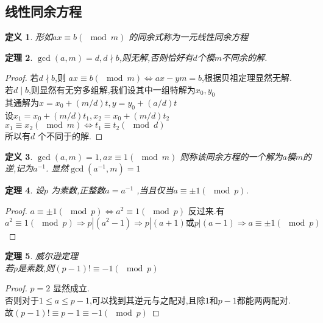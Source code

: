 \documentclass[12pt, a4paper, oneside]{ctexbook}
\newtheorem{theorem}{定理}[section]
\newtheorem{definition}[theorem]{定义}
\begin{document}
\subsection{线性同余方程}
\begin{definition}
  形如$ax \equiv b (\mod m)$ 的同余式称为一元线性同余方程
\end{definition}

\begin{theorem}
  $\gcd(a,m)=d,d\nmid b$,则无解,否则恰好有$d$个模$m$不同余的解.
\end{theorem}


\begin{proof}
  若$d\nmid b$,则 $ax \equiv b (\mod m)\iff ax-ym=b$,根据贝祖定理显然无解.\\
若$d\mid b$,则显然有无穷多组解,我们设其中一组特解为$x_0,y_0$ \\
其通解为$x=x_0+(m/d)t,y=y_0+(a/d)t$\\
设$x_1=x_0+(m/d)t_1,x_2=x_0+(m/d)t_2$\\
$x_1 \equiv x_2 (\mod m) \iff t_1 \equiv t_2 (\mod d)$\\
所以有$d$ 个不同于的解.
\end{proof}


\begin{definition}
  $\gcd(a,m)=1,ax \equiv 1 (\mod m)$ 则称该同余方程的一个解为$a$模$m$的逆,记为$a^{-1}$.
显然$\gcd(a^{-1},m)=1$
\end{definition}

\begin{theorem}
  设$p$ 为素数,正整数$a=a^{-1}$ ,当且仅当$a \equiv \pm 1(\mod p)$.
\end{theorem}


\begin{proof}
$a \equiv \pm 1(\mod p) \iff a^{2} \equiv 1(\mod p)$
反过来.有\\
$a^{2} \equiv 1(\mod p) \Rightarrow p|(a^2-1) \Rightarrow p|(a+1) 或p|(a-1) \Rightarrow a \equiv \pm 1(\mod p)$
\end{proof}

\begin{theorem}
  威尔逊定理\\
  若$p$是素数,则$(p-1)! \equiv -1 (\mod p)$
\end{theorem}

\begin{proof}
  $p=2$ 显然成立.\\
否则对于$1 \leq a \leq p-1$,可以找到其逆元与之配对,且除$1$和$p-1$都能两两配对.\\
故$(p-1)! \equiv p-1 \equiv -1 (\mod p)$
\end{proof}
\end{document}
